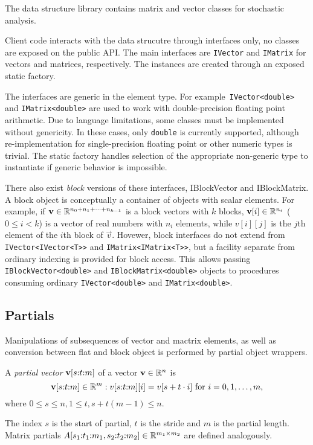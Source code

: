 The data structure library contains matrix and vector classes for
stochastic analysis.

Client code interacts with the data strucutre through interfaces only,
no classes are exposed on the public API. The main interfaces are
\texttt{IVector} and \texttt{IMatrix} for vectors and matrices,
respectively. The instances are created through an exposed static
factory.

The interfaces are generic in the element type. For
example~\texttt{IVector<double>} and \texttt{IMatrix<double>} are used
to work with double-precision floating point arithmetic. Due to
language limitations, some classes must be implemented without
genericity. In these cases, only \texttt{double} is currently
supported, although re-implementation for single-precision floating
point or other numeric types is trivial. The static factory handles
selection of the appropriate non-generic type to instantiate if
generic behavior is impossible.

There also exist \emph{block} versions of these interfaces,
IBlockVector and IBlockMatrix. A block object is conceptually a
container of objects with scalar elements. For example, if
$\bm{\mathrm{v}} \in \mathbb{R}^{n_0 + n_1 + \cdots + n_{k - 1}}$ is a block vectors
with $k$ blocks, $\bm{\mathrm{v}}[i] \in \mathbb{R}^{n_i}$ ($0 \le i < k$) is a
vector of real numbers with $n_i$ elements, while $v[i][j]$ is the
$j$th element of the $i$th block of $\vec{v}$. Hovewer, block
interfaces do not extend from \texttt{IVector<IVector<T>>} and
\texttt{IMatrix<IMatrix<T>>}, but a facility separate from ordinary
indexing is provided for block access. This allows passing
\texttt{IBlockVector<double>} and \texttt{IBlockMatrix<double>}
objects to procedures consuming ordinary \texttt{IVector<double>} and
\texttt{IMatrix<double>}.

\subsection{Partials}

Manipulations of subsequences of vector and mactrix elements, as well
as conversion between flat and block object is performed by partial
object wrappers.

\begin{dfn}
  A \emph{partial vector} $\bm{\mathrm{v}}[s{:}t{:}m]$ of a vector
  $\bm{\mathrm{v}} \in \mathbb{R}^n$ is
  \begin{equation}
    \bm{\mathrm{v}}[s{:}t{:}m] \in \mathbb{R}^m : v[s{:}t{:}m][i] =
    v[s + t \cdot i] \text{ for $i = 0, 1, \ldots, m$,}
  \end{equation}
  where $0 \le s \le n, 1 \le t, s + t (m - 1) \le n$.
\end{dfn}
The index $s$ is the start of partial, $t$ is the stride and $m$ is
the partial length. Matrix partials
$A[s_1{:}t_1{:}m_1, s_2{:}t_2{:}m_2] \in \mathbb{R}^{m_1 \times
  m_2}$ are defined analogously.

